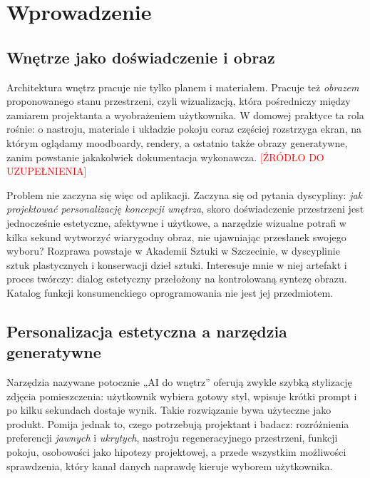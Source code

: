 \chapter{Wprowadzenie}
\label{ch01:top}

\section{Wnętrze jako doświadczenie i obraz}
\label{ch01:sec:tlo}

Architektura wnętrz pracuje nie tylko planem i materiałem. Pracuje też \emph{obrazem} proponowanego stanu przestrzeni, czyli wizualizacją, która pośredniczy między zamiarem projektanta a wyobrażeniem użytkownika.
W domowej praktyce ta rola rośnie: o nastroju, materiale i układzie pokoju coraz częściej rozstrzyga ekran, na którym oglądamy moodboardy, rendery, a ostatnio także obrazy generatywne, zanim powstanie jakakolwiek dokumentacja wykonawcza. \textcolor{red}{[ŹRÓDŁO DO UZUPEŁNIENIA]}

Problem nie zaczyna się więc od aplikacji. Zaczyna się od pytania dyscypliny: \emph{jak projektować personalizację koncepcji wnętrza}, skoro doświadczenie przestrzeni jest jednocześnie estetyczne, afektywne i użytkowe, a narzędzie wizualne potrafi w kilka sekund wytworzyć wiarygodny obraz, nie ujawniając przesłanek swojego wyboru?
Rozprawa powstaje w Akademii Sztuki w Szczecinie, w dyscyplinie sztuk plastycznych i konserwacji dzieł sztuki. Interesuje mnie w niej artefakt i proces twórczy: dialog estetyczny przełożony na kontrolowaną syntezę obrazu. Katalog funkcji konsumenckiego oprogramowania nie jest jej przedmiotem.

\section{Personalizacja estetyczna a narzędzia generatywne}
\label{ch01:sec:luka}

Narzędzia nazywane potocznie „AI do wnętrz” oferują zwykle szybką stylizację zdjęcia pomieszczenia: użytkownik wybiera gotowy styl, wpisuje krótki prompt i po kilku sekundach dostaje wynik.
Takie rozwiązanie bywa użyteczne jako produkt. Pomija jednak to, czego potrzebują projektant i badacz: rozróżnienia preferencji \emph{jawnych} i \emph{ukrytych}, nastroju regeneracyjnego przestrzeni, funkcji pokoju, osobowości jako hipotezy projektowej, a przede wszystkim możliwości sprawdzenia, który kanał danych naprawdę kieruje wyborem użytkownika.

